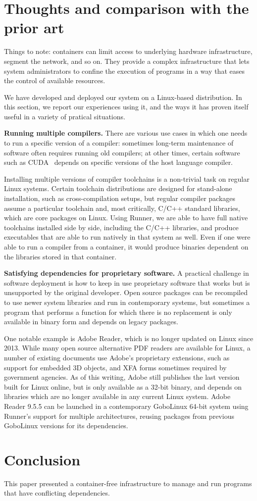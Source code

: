 \documentclass[sigplan, anonymous, 10pt]{acmart}
\begin{document}
\section{Thoughts and comparison with the prior art}
Things to note: containers can limit access to underlying hardware infrastructure, segment the
network, and so on. They provide a complex infrastructure that lets system administrators to
confine the execution of programs in a way that eases the control of available resources.

We have developed and deployed our system on a Linux-based distribution.
In this section, we report our experiences using it, and the ways it has
proven itself useful in a variety of pratical situations.

\textbf{Running multiple compilers.}
There are various use cases in which one needs to run a specific version of
a compiler: sometimes long-term maintenance of software often requires running
old compilers; at other times, certain software such as CUDA~\cite{XXX}
depends on specific versions of the host language compiler.

Installing multiple versions of compiler toolchains is a non-trivial task on regular
Linux systems. Certain toolchain distributions are designed for stand-alone
installation, such as cross-compilation setups, but regular compiler packages
assume a particular toolchain and, most critically, C/C++ standard libraries, which
are core packages on Linux. Using Runner, we are able to have full native
toolchains installed side by side, including the C/C++ libraries, and produce
executables that are able to run natively in that system as well. Even if one
were able to run a compiler from a container, it would produce binaries dependent
on the libraries stored in that container.

\textbf{Satisfying dependencies for proprietary software.}
A practical challenge in software deployment is how to keep in use
proprietary software that works but is unsupported by the original developer.
Open source packages can be recompiled to use newer system libraries and
run in contemporary systems, but sometimes a program that performs
a function for which there is no replacement is only available in binary form
and depends on legacy packages.

One notable example is Adobe Reader, which is no longer updated on Linux since
2013. While many open source alternative PDF readers are available for Linux,
a number of existing documents use Adobe's proprietary extensions, such as
support for embedded 3D objects, and XFA forms sometimes required by
government agencies. As of this writing, Adobe still publishes the last
version built for Linux online, but is only available as a 32-bit binary,
and depends on libraries which are no longer available in any current Linux
system. Adobe Reader 9.5.5 can be launched in a contemporary GoboLinux
64-bit system using Runner's support for multiple architectures,
reusing packages from previous GoboLinux versions for its dependencies.

\section{Conclusion}
This paper presented a container-free infrastructure to manage and run programs that have
conflicting dependencies. 

\lipsum[14-16]



\end{document}
